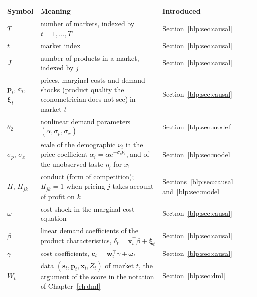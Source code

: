{\noindent\small\centering
\setlength{\tabcolsep}{4pt}\renewcommand{\arraystretch}{1.1}
\begin{tabular}{>{\raggedright\arraybackslash}p{1.0in}>{\raggedright\arraybackslash}p{2.15in}>{\raggedright\arraybackslash}p{0.95in}}
\toprule
Symbol & Meaning & Introduced \\
\midrule
$T$ & number of markets, indexed by $t = 1, \dots, T$ & Section~\ref{blp:sec:causal} \\
$t$ & market index & Section~\ref{blp:sec:causal} \\
$J$ & number of products in a market, indexed by $j$ & Section~\ref{blp:sec:causal} \\
$\bm p_t$, $\bm c_t$, $\bm\xi_t$ & prices, marginal costs and demand shocks (product quality the econometrician does not see) in market $t$ & Section~\ref{blp:sec:causal} \\
$\theta_2$ & nonlinear demand parameters $(\alpha, \sigma_p, \sigma_x)$ & Section~\ref{blp:sec:model} \\
$\sigma_p$, $\sigma_x$ & scale of the demographic $\nu_i$ in the price coefficient $\alpha_i = \alpha e^{-\sigma_p\nu_i}$, and of the unobserved taste $\eta_i$ for $x_1$ & Section~\ref{blp:sec:model} \\
$H$, $H_{jk}$ & conduct (form of competition); $H_{jk} = 1$ when pricing $j$ takes account of profit on $k$ & Sections~\ref{blp:sec:causal} and~\ref{blp:sec:model} \\
$\omega$ & cost shock in the marginal cost equation & Section~\ref{blp:sec:causal} \\
$\beta$ & linear demand coefficients of the product characteristics, $\delta_t = \bm x_t^\top\beta + \bm\xi_t$ & Section~\ref{blp:sec:causal} \\
$\gamma$ & cost coefficients, $\bm c_t = \bm w_t^\top\gamma + \bm\omega_t$ & Section~\ref{blp:sec:causal} \\
$W_t$ & data $(\bm s_t, \bm p_t, \bm x_t, Z_t)$ of market $t$, the argument of the score in the notation of Chapter~\ref{ch:dml} & Section~\ref{blp:sec:dml} \\
\end{tabular}\par}

